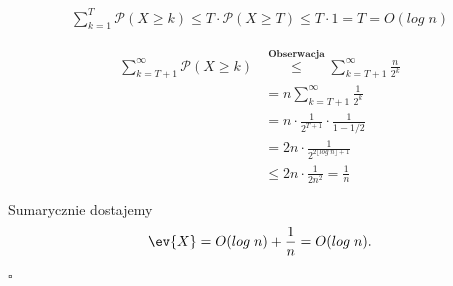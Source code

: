 \begin{align*}
	\sum_{k=1}^T \mathcal{P}(X \ge k) \le T \cdot \mathcal{P}(X \ge T) \le T \cdot 1 = T = O(log \; n)
\end{align*}

\begin{align*}
	\sum_{k=T+1}^\infty \mathcal{P}(X \ge k) & \overset{\textbf{Obserwacja}}{\le} \sum_{k=T+1}^\infty \frac{n}{2^k} \\
	                                         & = n \sum_{k=T+1}^\infty \frac{1}{2^k}                                \\
	                                         & = n \cdot \frac{1}{2^{T+1}} \cdot \frac{1}{1 - 1/2}                  \\
	                                         & = 2n \cdot \frac{1}{2^{2 \lfloor log \; n \rfloor+1}}                \\
	                                         & \le 2n \cdot \frac{1}{2n^2} = \frac{1}{n}
\end{align*}

Sumarycznie dostajemy
\[
	\ev{X} = O(log \; n) + \frac{1}{n} = O(log \; n).
\]
\hfill \(\square\)
